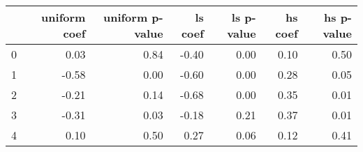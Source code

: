 \begin{tabular}{lrrrrrr}
\toprule
 & uniform coef & uniform p-value & ls coef & ls p-value & hs coef & hs p-value \\
\midrule
0 & 0.03 & 0.84 & -0.40 & 0.00 & 0.10 & 0.50 \\
1 & -0.58 & 0.00 & -0.60 & 0.00 & 0.28 & 0.05 \\
2 & -0.21 & 0.14 & -0.68 & 0.00 & 0.35 & 0.01 \\
3 & -0.31 & 0.03 & -0.18 & 0.21 & 0.37 & 0.01 \\
4 & 0.10 & 0.50 & 0.27 & 0.06 & 0.12 & 0.41 \\
\bottomrule
\end{tabular}
